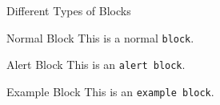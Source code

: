 \documentclass[
	aspectratio=169
	] {beamer}
\begin{document}
\begin{frame}{Different Types of Blocks}
	\begin{block}{Normal Block}
		This is a normal \texttt{block}.
	\end{block}

	\begin{alertblock}{Alert Block}
		This is an \texttt{alert block}.
	\end{alertblock}

	\begin{exampleblock}{Example Block}
		This is an \texttt{example block}.
	\end{exampleblock}
\end{frame}


\renewcommand{\thankyou}{Thank you very much for your attention!}
\renewcommand{\subthankyou}{I look forward to an exciting discussion!}
\renewcommand{\authormail}{author@upb.de}
\thankyouframe
\end{document}
